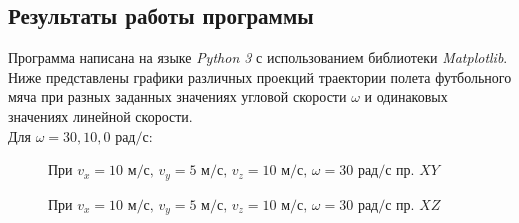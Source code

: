 \documentclass[a5paper, 10pt]{article}
\theoremstyle{definition}
\theoremstyle{plain}
\theoremstyle{remark}
\begin{document}
\subsection{Результаты работы программы}
Программа написана на языке \textit{Python 3} с использованием библиотеки \textit{Matplotlib}. \\
Ниже представлены графики различных проекций траектории полета футбольного мяча при разных заданных значениях угловой скорости $\omega$ и одинаковых значениях линейной скорости.\\
Для $\omega = 30, 10, 0  \text{ рад/с} $:
\begin{figure}[!h]
	           \caption{При $v_x = 10 \text{ м/с}, \, v_y = 5  \text{ м/с}, \, v_z = 10  \text{ м/с}, \, \omega = 30 \text{ рад/с}$ пр. $XY$}
\end{figure}

\begin{figure}[!h]
	           \caption{При $v_x = 10 \text{ м/с}, \, v_y = 5  \text{ м/с}, \, v_z = 10  \text{ м/с}, \, \omega = 30 \text{ рад/с}$ пр. $XZ$}
\end{figure}
\end{document}
